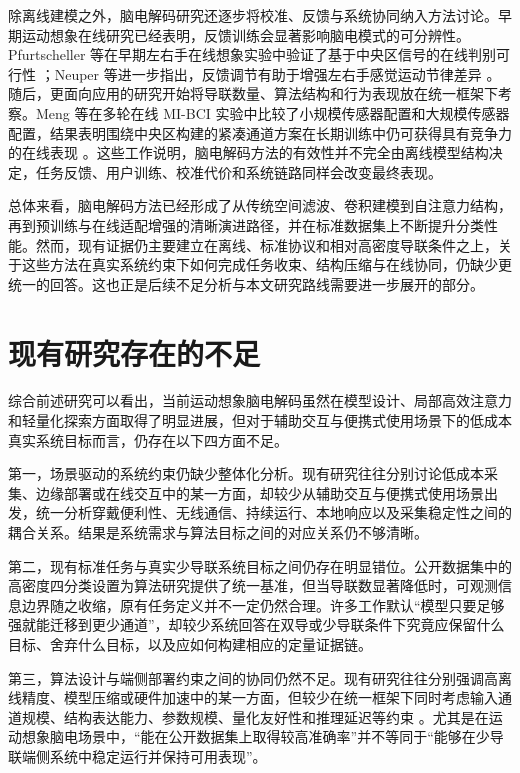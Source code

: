除离线建模之外，脑电解码研究还逐步将校准、反馈与系统协同纳入方法讨论。早期运动想象在线研究已经表明，反馈训练会显著影响脑电模式的可分辨性。Pfurtscheller 等在早期左右手在线想象实验中验证了基于中央区信号的在线判别可行性 \cite{Pfu97}；Neuper 等进一步指出，反馈调节有助于增强左右手感觉运动节律差异 \cite{Neu99}。随后，更面向应用的研究开始将导联数量、算法结构和行为表现放在统一框架下考察。Meng 等在多轮在线 MI-BCI 实验中比较了小规模传感器配置和大规模传感器配置，结果表明围绕中央区构建的紧凑通道方案在长期训练中仍可获得具有竞争力的在线表现 \cite{Men18}。这些工作说明，脑电解码方法的有效性并不完全由离线模型结构决定，任务反馈、用户训练、校准代价和系统链路同样会改变最终表现。

总体来看，脑电解码方法已经形成了从传统空间滤波、卷积建模到自注意力结构，再到预训练与在线适配增强的清晰演进路径，并在标准数据集上不断提升分类性能。然而，现有证据仍主要建立在离线、标准协议和相对高密度导联条件之上，关于这些方法在真实系统约束下如何完成任务收束、结构压缩与在线协同，仍缺少更统一的回答。这也正是后续不足分析与本文研究路线需要进一步展开的部分。

\section{现有研究存在的不足}

综合前述研究可以看出，当前运动想象脑电解码虽然在模型设计、局部高效注意力和轻量化探索方面取得了明显进展，但对于辅助交互与便携式使用场景下的低成本真实系统目标而言，仍存在以下四方面不足。

第一，场景驱动的系统约束仍缺少整体化分析。现有研究往往分别讨论低成本采集、边缘部署或在线交互中的某一方面，却较少从辅助交互与便携式使用场景出发，统一分析穿戴便利性、无线通信、持续运行、本地响应以及采集稳定性之间的耦合关系。结果是系统需求与算法目标之间的对应关系仍不够清晰。

第二，现有标准任务与真实少导联系统目标之间仍存在明显错位。公开数据集中的高密度四分类设置为算法研究提供了统一基准，但当导联数显著降低时，可观测信息边界随之收缩，原有任务定义并不一定仍然合理。许多工作默认“模型只要足够强就能迁移到更少通道”，却较少系统回答在双导或少导联条件下究竟应保留什么目标、舍弃什么目标，以及应如何构建相应的定量证据链。

第三，算法设计与端侧部署约束之间的协同仍然不足。现有研究往往分别强调高离线精度、模型压缩或硬件加速中的某一方面，但较少在统一框架下同时考虑输入通道规模、结构表达能力、参数规模、量化友好性和推理延迟等约束 \cite{keu2024compact, wan2023novel, hua2023improved}。尤其是在运动想象脑电场景中，“能在公开数据集上取得较高准确率”并不等同于“能够在少导联端侧系统中稳定运行并保持可用表现”。

